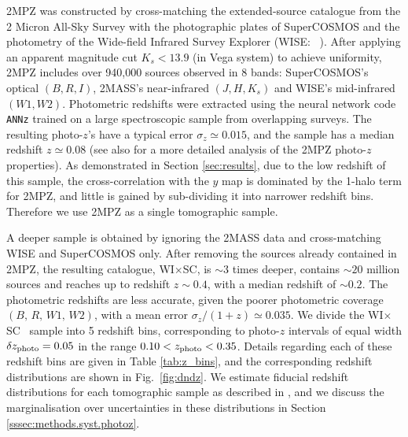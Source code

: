 \documentclass[useAMS,usenatbib]{mn2e}
\newcommand{\wisc}{WI$\times$SC}
\def\citejap#1{\citeauthor{#1}\ \citeyear{#1}}
\begin{document}
    2MPZ was constructed by cross-matching the extended-source catalogue from the 2 Micron All-Sky Survey \citep[2MASS,][]{2006AJ....131.1163S,2000AJ....119.2498J} with the photographic plates of SuperCOSMOS \citep{2001MNRAS.326.1295H,2016MNRAS.462.2085P} and the photometry of the Wide-field Infrared Survey Explorer (WISE: \citejap{2010AJ....140.1868W}). After applying an apparent magnitude cut $K_s<13.9$ (in Vega system) to achieve uniformity, 2MPZ includes over 940,000 sources observed in 8 bands: SuperCOSMOS's optical $(B,R,I)$, 2MASS's near-infrared $(J,H,K_s)$ and WISE's mid-infrared $(W1,W2)$. Photometric redshifts were extracted using the neural network code {\tt ANNz} \citep{2004PASP..116..345C} trained on a large spectroscopic sample from overlapping surveys. The resulting photo-$z$'s have a typical error $\sigma_z\simeq0.015$, and the sample has a median redshift $z\simeq0.08$ (see also \citealt{2018MNRAS.476.1050B} for a more detailed analysis of the 2MPZ photo-$z$ properties). As demonstrated in Section \ref{sec:results}, due to the low redshift of this sample, the cross-correlation with the $y$ map is dominated by the 1-halo term for 2MPZ, and little is gained by sub-dividing it into narrower redshift bins. Therefore we use 2MPZ as a single tomographic sample.
    
    A deeper sample is obtained by ignoring the 2MASS data and cross-matching WISE and SuperCOSMOS only. After removing the sources already contained in 2MPZ, the resulting catalogue, \wisc, is $\sim3$ times deeper, contains $\sim20$ million sources and reaches up to redshift $z\sim0.4$, with a median redshift of $\sim0.2$. The photometric redshifts are less accurate, given the poorer photometric coverage $(B,\,R,\,W1,\,W2)$, with a mean error $\sigma_z/(1+z)\simeq0.035$. We divide the \wisc~ sample into 5 redshift bins, corresponding to photo-$z$ intervals of equal width $\delta z_{\rm photo}=0.05$ in the range $0.10<z_{\rm photo}<0.35$. Details regarding each of these redshift bins are given in Table \ref{tab:z_bins}, and the corresponding redshift distributions are shown in Fig.\!~\ref{fig:dndz}. We estimate fiducial redshift distributions for each tomographic sample as described in \cite{2018MNRAS.481.1133P}, and we discuss the marginalisation over uncertainties in these distributions in Section \ref{sssec:methods.syst.photoz}.
\end{document}
